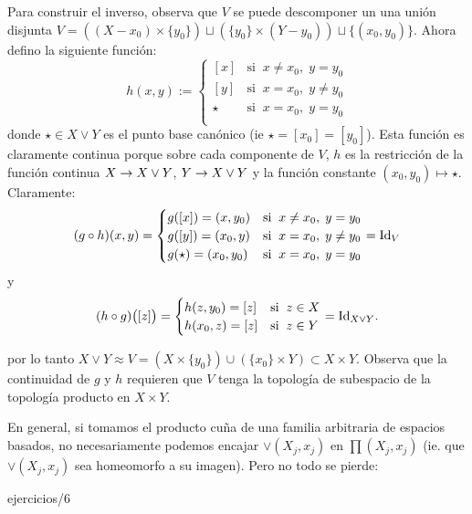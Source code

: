\documentclass[../../topologia_algebraica]{subfiles}
\begin{document}
Para construir el inverso, observa que $V$ se puede descomponer un una uni\'on disjunta
$V=((X-x_0)\times\{y_0\})\sqcup(\{y_0\}\times(Y-y_0))\sqcup\{(x_0,y_0)\}$. Ahora defino
la siguiente funci\'on:
\[
  h(x,y):=
  \begin{cases}
    [x] &\text{si}\;\; x\neq x_0,\; y=y_0 \\
    [y] &\text{si}\;\; x= x_0,\; y\neq y_0 \\
    \star &\text{si}\;\; x= x_0,\; y=y_0 \\
  \end{cases}
\]
donde $\star\in X\vee Y$ es el punto base can\'onico (ie $\star=[x_0]=[y_0]$). Esta funci\'on es
claramente continua porque sobre cada componente de $V$, $h$ es la restricci\'on de la funci\'on
continua $X\rightarrow X\vee Y$, $Y\rightarrow X\vee Y$ y la funci\'on constante $(x_0,y_0)\mapsto\star$. Claramente:
\[
  (g\circ h)(x,y)=
    \begin{cases}
    g([x])=(x,y_0) &\text{si}\;\; x\neq x_0,\; y=y_0 \\
    g([y])=(x_0,y) &\text{si}\;\; x= x_0,\; y\neq y_0 \\
    g(\star)=(x_0,y_0) &\text{si}\;\; x= x_0,\; y=y_0 \\
  \end{cases}=\text{Id}_V
\]
y
\[
  (h\circ g)\big([z]\big)=
  \begin{cases}
    h(z,y_0)=[z] &\text{si}\;\; z\in X \\
    h(x_0,z)=[z] &\text{si}\;\; z\in Y    
  \end{cases}=\text{Id}_{X\vee Y}.
\]

por lo tanto $X\vee Y \approx V=(X\times \{y_0\})\cup(\{x_0\}\times Y)\subset X\times Y$. Observa
que la continuidad de $g$ y $h$ requieren que $V$ tenga la topolog\'ia de subespacio de la topolog\'ia
producto en $X\times Y$.

En general, si tomamos el producto cu\~na de una familia arbitraria de espacios basados, no
necesariamente podemos encajar $\vee(X_j,x_j)$ en $\prod (X_j,x_j)$ (ie. que $\vee(X_j,x_j)$ sea
homeomorfo a su imagen). Pero no todo se pierde:

{ejercicios/6}  %
\end{document}
